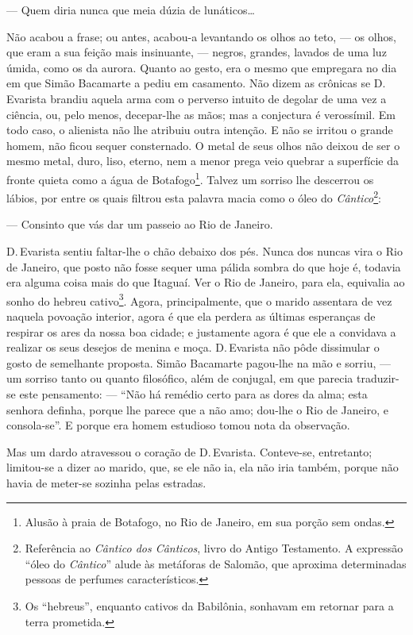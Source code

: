 --- Quem diria nunca que meia dúzia de lunáticos\ldots{}

Não acabou a frase; ou antes, acabou-a levantando os olhos ao teto, ---
os olhos, que eram a sua feição mais insinuante, --- negros, grandes,
lavados de uma luz úmida, como os da aurora. Quanto ao gesto, era o
mesmo que empregara no dia em que Simão Bacamarte a pediu em casamento.
Não dizem as crônicas se D.\,Evarista brandiu aquela arma com o perverso
intuito de degolar de uma vez a ciência, ou, pelo menos, decepar-lhe as
mãos; mas a conjectura é verossímil. Em todo caso, o alienista não lhe
atribuiu outra intenção. E não se irritou o grande homem, não ficou
sequer consternado. O metal de seus olhos não deixou de ser o mesmo
metal, duro, liso, eterno, nem a menor prega veio quebrar a superfície
da fronte quieta como a água de Botafogo\footnote{Alusão à praia de
  Botafogo, no Rio de Janeiro, em sua porção sem ondas.}. Talvez um
sorriso lhe descerrou os lábios, por entre os quais filtrou esta palavra
macia como o óleo do \emph{Cântico}\footnote{Referência ao \emph{Cântico
  dos Cânticos}, livro do Antigo Testamento. A expressão ``óleo do
  \emph{Cântico}'' alude às metáforas de Salomão, que aproxima
  determinadas pessoas de perfumes característicos.}:

--- Consinto que vás dar um passeio ao Rio de Janeiro.

D.\,Evarista sentiu faltar-lhe o chão debaixo dos pés. Nunca dos nuncas
vira o Rio de Janeiro, que posto não fosse sequer uma pálida sombra do
que hoje é, todavia era alguma coisa mais do que Itaguaí. Ver o Rio de
Janeiro, para ela, equivalia ao sonho do hebreu cativo\footnote{Os
  ``hebreus'', enquanto cativos da Babilônia, sonhavam em retornar para
  a terra prometida.}. Agora, principalmente, que o marido assentara de
vez naquela povoação interior, agora é que ela perdera as últimas
esperanças de respirar os ares da nossa boa cidade; e justamente agora é
que ele a convidava a realizar os seus desejos de menina e moça. D.\,Evarista não pôde dissimular o gosto de semelhante proposta. Simão
Bacamarte pagou-lhe na mão e sorriu, --- um sorriso tanto ou quanto
filosófico, além de conjugal, em que parecia traduzir-se este
pensamento: --- ``Não há remédio certo para as dores da alma; esta
senhora definha, porque lhe parece que a não amo; dou-lhe o Rio de
Janeiro, e consola-se''. E porque era homem estudioso tomou nota da
observação.

Mas um dardo atravessou o coração de D.\,Evarista. Conteve-se,
entretanto; limitou-se a dizer ao marido, que, se ele não ia, ela não
iria também, porque não havia de meter-se sozinha pelas estradas.

